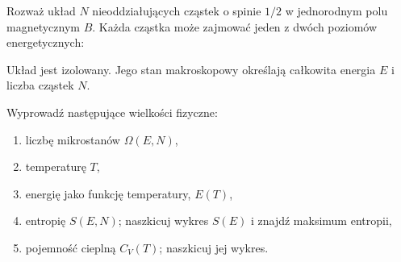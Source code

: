 
Rozważ układ $N$ nieoddziałujących cząstek o spinie $1/2$ w jednorodnym polu
magnetycznym $B$. Każda cząstka może zajmować jeden z dwóch poziomów
energetycznych:

\begin{center}
\end{center}

Układ jest izolowany. Jego stan makroskopowy określają całkowita energia $E$
i liczba cząstek $N$.

Wyprowadź następujące wielkości fizyczne:
\begin{enumerate}[label=(\alph*)]
  \item liczbę mikrostanów $\Omega(E,N)$,
  \item temperaturę $T$,
  \item energię jako funkcję temperatury, $E(T)$,
  \item entropię $S(E,N)$; naszkicuj wykres $S(E)$ i znajdź maksimum entropii,
  \item pojemność cieplną $C_V(T)$; naszkicuj jej wykres.
\end{enumerate}

